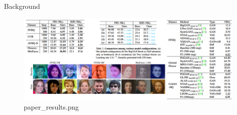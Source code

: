 \documentclass[
  ignorenonframetext,
]{beamer}
\begin{document}
\begin{frame}[fragile]{Background}
\begin{figure}

{\centering \includegraphics{Perception Prioritized Training of Diffusion Models_files/figure-beamer/paper_results.png}

}

\caption{paper\_results.png}

\end{figure}
\end{frame}
\end{document}
